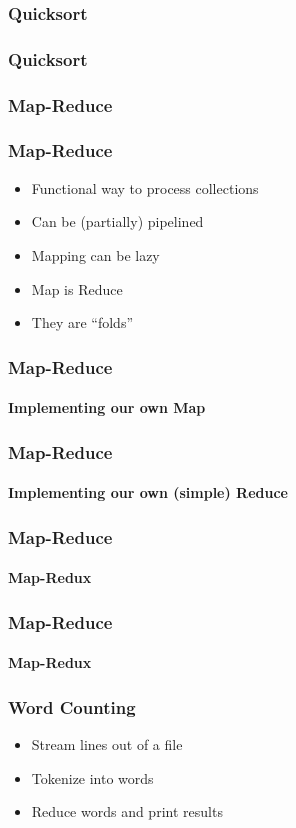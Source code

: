 \documentclass[english]{beamer}
\begin{document}
\begin{frame}[fragile]
\frametitle{Quicksort}

\end{frame}

\begin{frame}[fragile]
\frametitle{Quicksort}

\end{frame}

\subsubsection{Map-Reduce}
\begin{frame}
\frametitle{Map-Reduce}
\begin{itemize}
\item<1->{Functional way to process collections}
\item<2->{Can be (partially) pipelined}
\item<3->{Mapping can be lazy}
\item<4->{Map is Reduce} %
\item<5->{They are ``folds''}
\end{itemize}
\end{frame}

\begin{frame}[fragile]
\frametitle{Map-Reduce}
\framesubtitle{Implementing our own Map}


\end{frame}

\begin{frame}[fragile]
\frametitle{Map-Reduce}
\framesubtitle{Implementing our own (simple) Reduce}


\end{frame}

\begin{frame}[fragile]
\frametitle{Map-Reduce}
\framesubtitle{Map-Redux}

\end{frame}

\begin{frame}[fragile]
\frametitle{Map-Reduce}
\framesubtitle{Map-Redux}

\end{frame}

\begin{frame}
\frametitle{Word Counting}
\begin{itemize}
\item{Stream lines out of a file}
\item{Tokenize into words}
\item{Reduce words and print results}
\end{itemize}
\end{frame}
\end{document}

